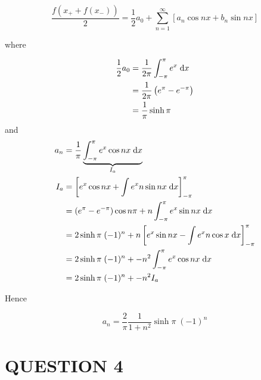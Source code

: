 \documentclass[a4paper]{article}
\begin{document}
\[ \frac{f(x_{+} + f(x_{-}))}{2} = \frac{1}{2} a_{0} + \sum_{n=1}^{\infty} \left[ a_{n} \cos n x + b_{n} \sin n x  \right]  \]


where 

\begin{align*}
\frac{1}{2} a_{0} & = \frac{1}{2\pi} \int_{-\pi}^{\pi} e^{x} \; \mathrm{d} x \\
& = \frac{1}{2\pi} \left(  e^{\pi} - e^{-\pi} \right) \\
& = \frac{1}{\pi} \sinh \pi
\end{align*}
and 
\begin{align*}
a_{n} & = \frac{1}{\pi} \underbrace{ \int_{-\pi}^{\pi} e^{x} \cos n x \; \mathrm{d} x}_{I_{a}}  \\
I_{a} & =  \left[   e^{x} \cos n x + \int e^{x} n \sin n x  \; \mathrm{d} x  \right]_{-\pi}^{\pi} \\
& = (e^{\pi} - e^{-\pi}  )\cos n \pi + n \int_{-\pi}^{\pi} e^{x} \sin n x \;\mathrm{d} x \\
& = 2 \sinh \pi \;  (-1)^{n} + n \left[  e^{x} \sin n x - \int e^{x} n \cos x \; \mathrm{d} x  \right]_{-\pi}^{\pi} \\
& =  2 \sinh \pi \;  (-1)^{n} + -n^{2} \int_{-\pi}^{\pi} e^{x} \cos n x \; \mathrm{d} x \\
& =  2 \sinh \pi \;  (-1)^{n} + -n^{2} I_{a}
\end{align*}

Hence 

\[ a_{n} = \frac{2}{\pi} \frac{1}{1 + n^{2}}  \sinh \pi \; (-1)^{n} \]

\section{QUESTION 4}
\end{document}
